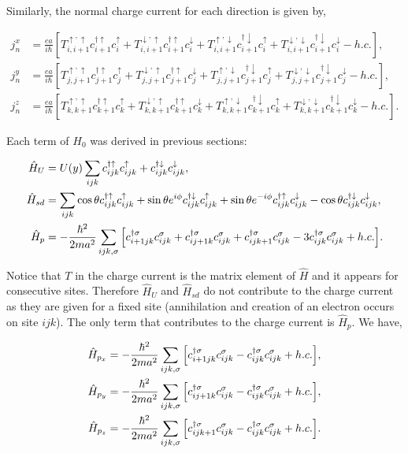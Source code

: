 \documentclass[10pt,prb,showpacs,amssymb,floatfix]{revtex4-1}
\newcommand{\dna}{\downarrow}
\newcommand{\upa}{\uparrow}
\newcommand{\sg}{\sigma}
\newcommand{\h}{\hat}
\begin{document}
Similarly, the normal charge current for each direction is given by,

\begin{align}
\label{corriente222x}
j^x_n &=\frac{ea}{i\hbar} [T^{\upa,\upa}_{i,i+1} c^{\dagger\upa}_{i+1} c^{\upa}_i+T^{\dna,\upa}_{i,i+1} c^{\dagger\upa}_{i+1} c^{\dna}_i + T^{\upa,\dna}_{i,i+1} c^{\dagger\dna}_{i+1} c^{\upa}_i+T^{\dna,\dna}_{i,i+1} c^{\dagger\dna}_{i+1} c^{\dna}_i   - h.c.], \\
j^y_n &=\frac{ea}{i\hbar} [T^{\upa,\upa}_{j,j+1} c^{\dagger\upa}_{j+1} c^{\upa}_j+T^{\dna,\upa}_{j,j+1} c^{\dagger\upa}_{j+1} c^{\dna}_j + T^{\upa,\dna}_{j,j+1} c^{\dagger\dna}_{j+1} c^{\upa}_j+T^{\dna,\dna}_{j,j+1} c^{\dagger\dna}_{j+1} c^{\dna}_j   - h.c.], \\
j^z_n &=\frac{ea}{i\hbar} [T^{\upa,\upa}_{k,k+1} c^{\dagger\upa}_{k+1} c^{\upa}_k+T^{\dna,\upa}_{k,k+1} c^{\dagger\upa}_{k+1} c^{\dna}_k + T^{\upa,\dna}_{k,k+1} c^{\dagger\dna}_{k+1} c^{\upa}_k+T^{\dna,\dna}_{k,k+1} c^{\dagger\dna}_{k+1} c^{\dna}_k   - h.c.].
\end{align}

Each term of $H_0$ was derived in previous sections:

\begin{align}
\label{lastU2h0}
\hat H_{U} &= U(y) \sum_{ijk}  c_{ijk}^{\dagger \uparrow} c_{ijk}^\uparrow  +   c_{ijk}^{\dagger \downarrow} c_{ijk}^\downarrow, \\
\hat H_{sd} &= \sum_{ijk}  \cos\theta c_{ijk}^{\dagger \uparrow} c_{ijk}^\uparrow +  \sin\theta e^{i\phi} c_{ijk}^{\dagger \downarrow} c_{ijk}^\uparrow+  \sin\theta e^{-i\phi} c_{ijk}^{\dagger \uparrow} c_{ijk}^\downarrow - \cos\theta  c_{ijk}^{\dagger \downarrow} c_{ijk}^\downarrow, \\
\hat H_{p} &=  -\frac{\hbar^2}{2ma^2} \sum_{ijk,\sg}  \Big{[} c_{i+1jk}^{\dagger \sg} c_{ijk}^\sg    + c_{ij+1k}^{\dagger \sg} c_{ijk}^\sg   + c_{ijk+1}^{\dagger \sg} c_{ijk}^\sg   -3 c_{ijk}^{\dagger \sg} c_{ijk}^\sg + h.c.  \Big{]}. 
\end{align}

Notice that $T$ in the charge current is the matrix element of $\h H$ and it appears for consecutive sites. Therefore $\h H_U$ and $\h H_{sd}$ do not contribute to the charge current as they are given for a fixed site (annihilation and creation of  an electron occurs on site $ijk$). The only term that contributes to the charge current is $\h H_p$. We have,

\begin{align}
\label{lastU2h02}
\hat H_{p_x} &=  -\frac{\hbar^2}{2ma^2} \sum_{ijk,\sg}  \Big{[} c_{i+1jk}^{\dagger \sg} c_{ijk}^\sg   - c_{ijk}^{\dagger \sg} c_{ijk}^\sg + h.c.  \Big{]}, \\
\hat H_{p_y} &=  -\frac{\hbar^2}{2ma^2} \sum_{ijk,\sg}  \Big{[}  c_{ij+1k}^{\dagger \sg} c_{ijk}^\sg   - c_{ijk}^{\dagger \sg} c_{ijk}^\sg + h.c.  \Big{]}, \\
\hat H_{p_z} &=  -\frac{\hbar^2}{2ma^2} \sum_{ijk,\sg}  \Big{[}  c_{ijk+1}^{\dagger \sg} c_{ijk}^\sg   - c_{ijk}^{\dagger \sg} c_{ijk}^\sg + h.c.  \Big{]}.  
\end{align}
\end{document}
